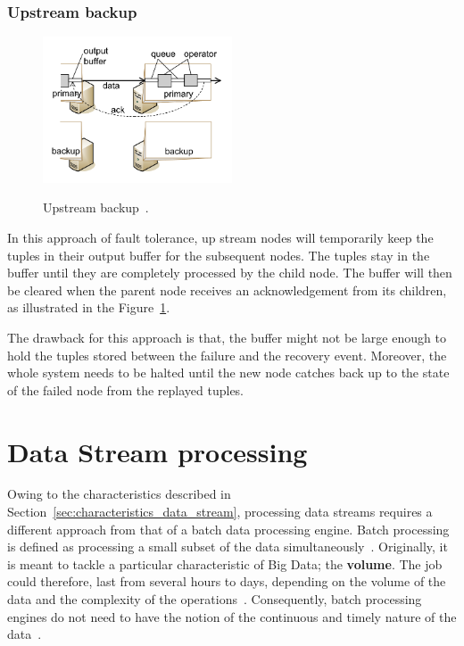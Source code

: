 \subsubsection{Upstream backup}

\begin{figure}[!htbp]
    \centering
    \includegraphics[width=0.5\textwidth]{fig/upstream.png}
    \label{fig:upstream}
    \caption{Upstream backup~\cite{upstream_backup}. }
    
\end{figure}


In this approach of fault tolerance, up stream nodes will temporarily 
keep the tuples in their output buffer for the subsequent nodes. The tuples 
stay in the buffer until they are completely processed by the child node. 
The buffer will then be cleared when the parent node receives 
an acknowledgement from its children, as illustrated in the Figure~\ref{fig:upstream}. 

The drawback for this approach is that, the buffer might not be large enough to 
hold the tuples stored between the failure and the recovery event. Moreover, 
the whole system needs to be halted until the new node catches back up to 
the state of the failed node from the replayed tuples. 

\section{Data Stream processing}

Owing to the characteristics described in Section~\ref{sec:characteristics_data_stream}, 
processing data streams requires a different approach from that of a batch data processing engine.
Batch processing is defined as processing a small subset of the data simultaneously~\cite{batch_processing}. 
Originally, it is meant to tackle a particular characteristic of Big Data; the \textbf{volume}. The job 
could therefore, last from several hours to days, depending on the volume of the data and the 
complexity of the operations~\cite{batch_duration}.
Consequently, batch processing engines do not need to have the notion of the continuous and 
timely nature of the data~\cite{flink}.

